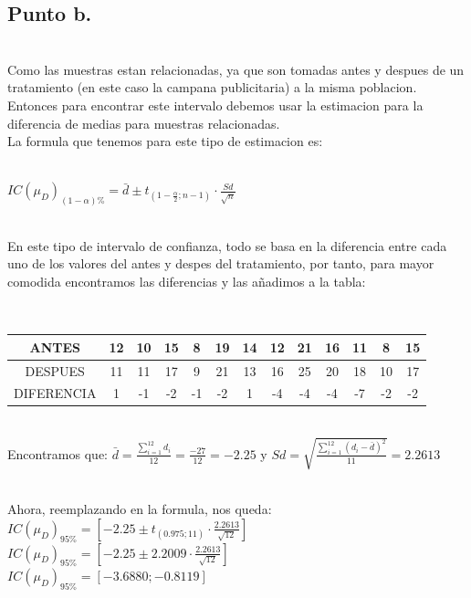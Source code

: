 \documentclass[letterpaper,12pt,onecolumn,titlepage]{article}
\begin{document}
\subsection{Punto b.}
~\\ Como las muestras estan relacionadas, ya que son tomadas antes y despues de un tratamiento (en este caso la campana publicitaria) a la misma poblacion. Entonces para encontrar este intervalo debemos usar la estimacion para la diferencia de medias para muestras relacionadas.
~\\ La formula que tenemos para este tipo de estimacion es:

~\\ $IC(\mu_{D})_{(1-\alpha)\%}=\bar{d} \pm t_{(1-\frac{\alpha}{2};n-1)}\cdot\frac{Sd}{\sqrt{n}}$

~\\ En este tipo de intervalo de confianza, todo se basa en la diferencia entre cada uno de los valores del antes y despes del tratamiento, por tanto, para mayor comodida encontramos las diferencias y las a\~{n}adimos a la tabla:
 
~\\ \begin{center}
 \begin{tabular}{|c|c|c|c|c|c|c|c|c|c|c|c|c|}
\hline 
\rule[-1ex]{0pt}{2.5ex} ANTES & 12 & 10 & 15 & 8 & 19 & 14 & 12 & 21 & 16 & 11 & 8 & 15 \\ 
\hline 
\rule[-1ex]{0pt}{2.5ex} DESPUES & 11 & 11 & 17 & 9 & 21 & 13 & 16 & 25 & 20 & 18 & 10 & 17 \\ 
\hline 
\rule[-1ex]{0pt}{2.5ex} DIFERENCIA & 1 & -1 & -2 & -1 & -2 & 1 & -4 & -4 & -4 & -7 & -2 & -2 \\ 
\hline 
\end{tabular} 
\end{center}

~\\ Encontramos que: $\bar{d}=\frac{\sum\limits_{i=1}^{12}d_{i}}{12}=\frac{-27}{12}=-2.25$ y $Sd=\sqrt{\frac{\sum\limits_{i=1}^{12}(d_{i}-\bar{d})^2}{11}}=2.2613$

~\\ Ahora, reemplazando en la formula, nos queda:
~\\ $IC(\mu_{D})_{95\%}=[-2.25 \pm t_{(0.975;11)}\cdot \frac{2.2613}{\sqrt{12}}]$
~\\ $IC(\mu_{D})_{95\%}=[-2.25 \pm 2.2009 \cdot \frac{2.2613}{\sqrt{12}}]$
~\\ $IC(\mu_{D})_{95\%}=[-3.6880 ; -0.8119]$
\end{document}
